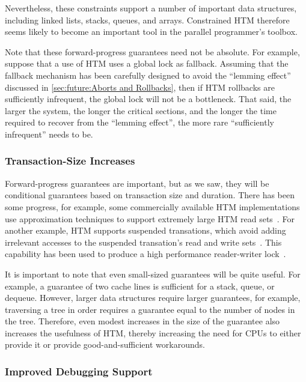 Nevertheless, these constraints support a number of important data structures,
including linked lists, stacks, queues, and arrays.
Constrained HTM therefore seems likely to become an important tool in
the parallel programmer's toolbox.

Note that these forward-progress guarantees need not be absolute.
For example, suppose that a use of HTM uses a global lock as fallback.
Assuming that the fallback mechanism has been carefully designed to
avoid the ``lemming effect'' discussed in
\cref{sec:future:Aborts and Rollbacks},
then if HTM rollbacks are sufficiently infrequent, the global lock
will not be a bottleneck.
That said, the larger the system, the longer the critical sections,
and the longer the time required to recover from the ``lemming effect'',
the more rare ``sufficiently infrequent'' needs to be.

\subsubsection{Transaction-Size Increases}
\label{sec:future:Transaction-Size Increases}

Forward-progress guarantees are important, but as we saw, they will
be conditional guarantees based on transaction size and duration.
There has been some progress, for example, some commercially available
HTM implementations use approximation techniques to support extremely
large HTM read sets~\cite{RaviRajwar2012TSX}.
For another example,  HTM supports suspended transations, which
avoid adding irrelevant accesses to the suspended transation's read and
write sets~\cite{Le:2015:TMS:3266491.3266500}.
This capability has been used to produce a high performance
reader-writer lock~\cite{PascalFelber2016rwlockElision}.

It is important to note that even small-sized guarantees will be
quite useful.
For example,
a guarantee of two cache lines is sufficient for a stack, queue, or dequeue.
However, larger data structures require larger guarantees, for example,
traversing a tree in order requires a guarantee equal to the number
of nodes in the tree.
Therefore, even modest increases in the size of the guarantee also
increases the usefulness of HTM, thereby increasing the need for CPUs
to either provide it or provide good-and-sufficient workarounds.

\subsubsection{Improved Debugging Support}
\label{sec:future:Improved Debugging Support}

